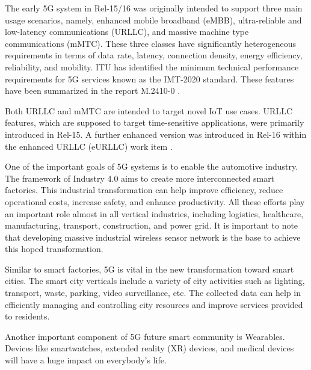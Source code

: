 \documentclass[conference]{IEEEtran}
\begin{document}
The early 5G system in Rel-15/16 was originally intended to support three main usage scenarios, namely, enhanced mobile broadband (eMBB), ultra-reliable and low-latency communications (URLLC), and massive machine type communications (mMTC). These three classes have significantly heterogeneous requirements in terms of data rate, latency, connection density, energy efficiency, reliability, and mobility. ITU has identified the minimum technical performance requirements for 5G services known as the IMT-2020 standard. These features have been summarized in the report M.2410-0 \cite{itu-r_minimum_2017_M.2410-0}.

 Both URLLC and mMTC are intended to target novel IoT use cases. URLLC features, which are supposed to target time-sensitive applications, were primarily introduced in Rel-15. A further enhanced version was introduced in Rel-16 within the enhanced URLLC (eURLLC) work item \cite{3gpp_study_nodate_38.824}.

One of the important goals of 5G systems is to enable the automotive industry. The framework of Industry 4.0 aims to create more interconnected smart factories. This industrial transformation can help improve efficiency, reduce operational costs, increase safety, and enhance productivity. All these efforts play an important role almost in all vertical industries, including logistics, healthcare, manufacturing, transport, construction, and power grid. It is important to note that developing massive industrial wireless sensor network is the base to achieve this hoped transformation. 

Similar to smart factories, 5G is vital in the new transformation toward smart cities. The smart city verticals include a variety of city activities such as lighting, transport, waste, parking, video surveillance, etc. The collected data can help in efficiently managing and controlling city resources and improve services provided to residents.

Another important component of 5G future smart community is Wearables. Devices like smartwatches, extended reality (XR) devices, and medical devices will have a huge impact on everybody's life.
\end{document}
